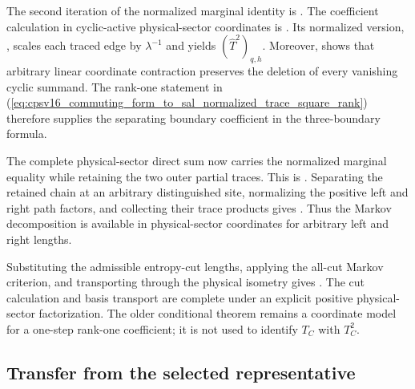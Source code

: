 \documentclass{article}
\begin{document}
The second iteration of the normalized marginal identity is
.
The coefficient calculation in cyclic-active physical-sector coordinates is
.
Its normalized version,
,
scales each traced edge by $\lambda^{-1}$ and yields
$(\widehat T^2)_{q,h}$. Moreover,
shows that arbitrary linear coordinate contraction preserves the deletion of
every vanishing cyclic summand. The rank-one statement in
(\ref{eq:cpsv16_commuting_form_to_sal_normalized_trace_square_rank}) therefore
supplies the separating boundary coefficient in the three-boundary formula.

The complete physical-sector direct sum now carries the normalized marginal
equality while retaining the two outer partial traces. This is
.
Separating the retained chain at an arbitrary distinguished site, normalizing
the positive left and right path factors, and collecting their trace products
gives
.
Thus the Markov decomposition is available in physical-sector coordinates for
arbitrary left and right lengths.

Substituting the admissible entropy-cut lengths, applying the all-cut Markov
criterion, and transporting through the physical isometry gives
.
The cut calculation and basis transport are complete under an explicit
positive physical-sector factorization. The older conditional theorem
 remains a coordinate model for
a one-step rank-one coefficient; it is not used to identify $T_C$ with
$T_C^2$.

\subsection{Transfer from the selected representative}
\end{document}

